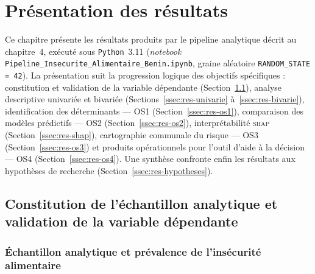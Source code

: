 %

\section{Présentation des résultats}
\label{sec:resultats}

Ce chapitre présente les résultats produits par le pipeline analytique décrit au
chapitre~4, exécuté sous \texttt{Python}~3.11 (\emph{notebook}
\texttt{Pipeline\_Insecurite\_Alimentaire\_Benin.ipynb}, graine aléatoire
\texttt{RANDOM\_STATE = 42}). La présentation suit la progression logique des
objectifs spécifiques : constitution et validation de la variable dépendante
(Section~\ref{ssec:res-echantillon}), analyse descriptive univariée et bivariée
(Sections~\ref{ssec:res-univarie} à~\ref{ssec:res-bivarie}), identification des
déterminants — OS1 (Section~\ref{ssec:res-os1}), comparaison des modèles
prédictifs — OS2 (Section~\ref{ssec:res-os2}), interprétabilité \textsc{shap}
(Section~\ref{ssec:res-shap}), cartographie communale du risque — OS3
(Section~\ref{ssec:res-os3}) et produits opérationnels pour l'outil d'aide à la
décision — OS4 (Section~\ref{ssec:res-os4}). Une synthèse confronte enfin les
résultats aux hypothèses de recherche (Section~\ref{ssec:res-hypotheses}).

\subsection{Constitution de l'échantillon analytique et validation de la variable dépendante}
\label{ssec:res-echantillon}

\subsubsection{Échantillon analytique et prévalence de l'insécurité alimentaire}

